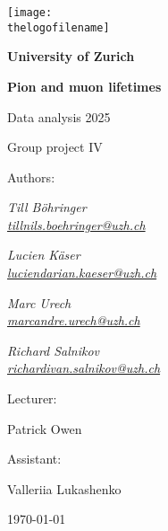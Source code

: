 \begin{titlepage}
    \setlength{\headheight}{0cm}
	\texttt{[image: \\thelogofilename]}\par\vspace{1cm}
	
	\centering
	
	{\bfseries\LARGE University of Zurich\par}
	\vspace{0.7cm}
	
	{\Huge\bfseries Pion and muon lifetimes\par}
	\vspace{0.7cm}

	{\LARGE Data analysis 2025 \par Group project IV \par }
	\vfill

    {\large Authors:\par\vspace{0.2cm}}
	{\Large\itshape Till Böhringer\\ \href{mailto:tillnils.boehringer@uzh.ch}{tillnils.boehringer@uzh.ch} \par
	\Large\itshape Lucien Käser\\ \href{mailto:luciendarian.kaeser@uzh.ch}{luciendarian.kaeser@uzh.ch} \par
	\Large\itshape Marc Urech\\ \href{mailto:marcandre.urech@uzh.ch}{marcandre.urech@uzh.ch} \par
	\Large\itshape Richard Salnikov\\ \href{mailto:richardivan.salnikov@uzh.ch}{richardivan.salnikov@uzh.ch} \par}
	\vfill

	
	{\large Lecturer:\par\vspace{0.2cm}}
	{\Large Patrick Owen}
	\vfill
	{\large Assistant:\par\vspace{0.2cm}}
	{\Large Valleriia Lukashenko}
	\vfill
	\vfill

	{\large \today\par}
\end{titlepage}
\restoregeometry %